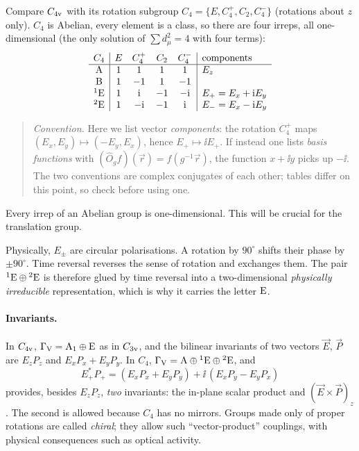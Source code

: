 Compare $C_{4\mathrm{v}}$ with its rotation subgroup $C_4=\{E,C_4^+,C_2,C_4^-\}$ (rotations about
$z$ only). $C_4$ is Abelian, every element is a class, so there are four irreps, all
one-dimensional (the only solution of $\sum d_\mu^2=4$ with four terms):
\begin{equation}\label{eq:C4table}
\begin{array}{c|cccc|l}
C_4 & E & C_4^+ & C_2 & C_4^- & \text{components}\\\hline
\mathrm{A} & 1&1&1&1 & E_z\\
\mathrm{B} & 1&-1&1&-1 & \\
{}^{1}\mathrm{E} & 1&\mathrm{i}&-1&-\mathrm{i} & E_+=E_x+\mathrm{i} E_y\\
{}^{2}\mathrm{E} & 1&-\mathrm{i}&-1&\mathrm{i} & E_-=E_x-\mathrm{i} E_y
\end{array}
\end{equation}
\begin{quote}\small
\emph{Convention.} Here we list vector \emph{components}: the rotation $C_4^+$ maps
$(E_x,E_y)\mapsto(-E_y,E_x)$, hence $E_+\mapsto\ii E_+$. If instead one lists
\emph{basis functions} with $(\hat{O}_gf)(\vec{r})=f(g^{-1}\vec{r})$, the function $x+\ii y$
picks up $-\ii$. The two conventions are complex conjugates of each other; tables
differ on this point, so check before using one.
\end{quote}
Every irrep of an Abelian group is one-dimensional. This will be crucial for the
translation group.

Physically, $E_\pm$ are circular polarisations. A rotation by $90^\circ$ shifts their
phase by $\pm90^\circ$. Time reversal reverses the sense of rotation and exchanges
them. The pair ${}^{1}\mathrm{E}\oplus{}^{2}\mathrm{E}$ is therefore glued by time reversal
into a two-dimensional \emph{physically irreducible} representation, which is why it
carries the letter $\mathrm{E}$.

\paragraph{Invariants.} In $C_{4\mathrm{v}}$, $\Gamma_{\mathrm{V}}=\mathrm{A}_1\oplus\mathrm{E}$ as in $C_{3\mathrm{v}}$, and
the bilinear invariants of two vectors $\vec{E}$, $\vec{P}$ are $E_zP_z$ and
$E_xP_x+E_yP_y$. In $C_4$, $\Gamma_{\mathrm{V}}=\mathrm{A}\oplus{}^{1}\mathrm{E}\oplus{}^{2}\mathrm{E}$, and
\[
E_+^{*}P_+=(E_xP_x+E_yP_y)+\ii\,(E_xP_y-E_yP_x)
\]
provides, besides $E_zP_z$, \emph{two} invariants: the in-plane scalar product and
$(\vec{E}\times\vec{P})_z$. The second is allowed because $C_4$ has no mirrors.
Groups made only of proper rotations are called \emph{chiral}; they allow such
``vector-product'' couplings, with physical consequences such as optical activity.

